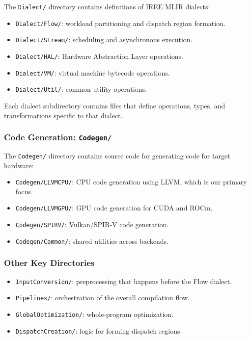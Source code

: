 \documentclass[11pt,a4paper]{article}
\begin{document}
The \texttt{Dialect/} directory contains definitions of IREE MLIR dialects:

\begin{itemize}
    \item \texttt{Dialect/Flow/}: workload partitioning and dispatch region formation.
    \item \texttt{Dialect/Stream/}: scheduling and asynchronous execution.
    \item \texttt{Dialect/HAL/}: Hardware Abstraction Layer operations.
    \item \texttt{Dialect/VM/}: virtual machine bytecode operations.
    \item \texttt{Dialect/Util/}: common utility operations.
\end{itemize}

Each dialect subdirectory contains files that define operations, types, and transformations specific to that dialect.

\subsubsection{Code Generation: \texttt{Codegen/}}

The \texttt{Codegen/} directory contains source code for generating code for target hardware:

\begin{itemize}
    \item \texttt{Codegen/LLVMCPU/}: CPU code generation using LLVM, which is our primary focus.
    \item \texttt{Codegen/LLVMGPU/}: GPU code generation for CUDA and ROCm.
    \item \texttt{Codegen/SPIRV/}: Vulkan/SPIR-V code generation.
    \item \texttt{Codegen/Common/}: shared utilities across backends.
\end{itemize}

\subsubsection{Other Key Directories}

\begin{itemize}
    \item \texttt{InputConversion/}: preprocessing that happens before the Flow dialect.
    \item \texttt{Pipelines/}: orchestration of the overall compilation flow.
    \item \texttt{GlobalOptimization/}: whole-program optimization.
    \item \texttt{DispatchCreation/}: logic for forming dispatch regions.
\end{itemize}
\end{document}
